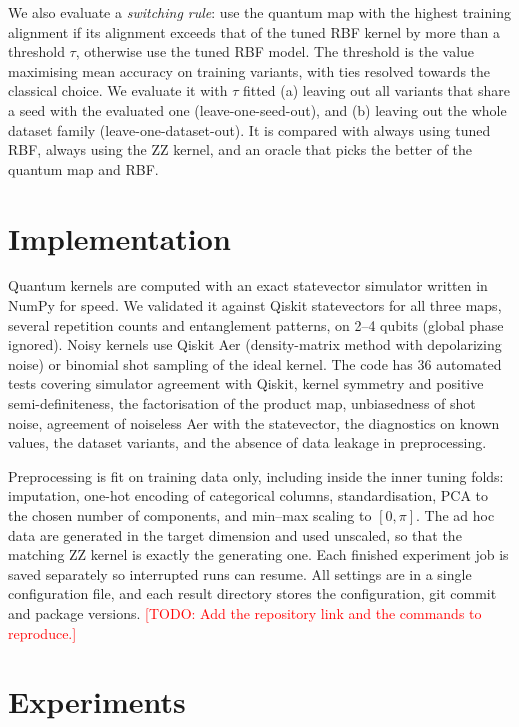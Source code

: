 \documentclass[11pt,a4paper]{article}
\newcommand{\todo}[1]{\textcolor{red}{[TODO: #1]}}
\begin{document}
We also evaluate a \emph{switching rule}: use the quantum map with the highest training alignment if its alignment exceeds that of the tuned RBF kernel by more than a threshold $\tau$, otherwise use the tuned RBF model. The threshold is the value maximising mean accuracy on training variants, with ties resolved towards the classical choice. We evaluate it with $\tau$ fitted (a) leaving out all variants that share a seed with the evaluated one (leave-one-seed-out), and (b) leaving out the whole dataset family (leave-one-dataset-out). It is compared with always using tuned RBF, always using the ZZ kernel, and an oracle that picks the better of the quantum map and RBF.

\section{Implementation}\label{sec:impl}
Quantum kernels are computed with an exact statevector simulator written in NumPy for speed. We validated it against Qiskit statevectors for all three maps, several repetition counts and entanglement patterns, on 2--4 qubits (global phase ignored). Noisy kernels use Qiskit Aer (density-matrix method with depolarizing noise) or binomial shot sampling of the ideal kernel. The code has 36 automated tests covering simulator agreement with Qiskit, kernel symmetry and positive semi-definiteness, the factorisation of the product map, unbiasedness of shot noise, agreement of noiseless Aer with the statevector, the diagnostics on known values, the dataset variants, and the absence of data leakage in preprocessing.

Preprocessing is fit on training data only, including inside the inner tuning folds: imputation, one-hot encoding of categorical columns, standardisation, PCA to the chosen number of components, and min--max scaling to $[0,\pi]$. The ad hoc data are generated in the target dimension and used unscaled, so that the matching ZZ kernel is exactly the generating one. Each finished experiment job is saved separately so interrupted runs can resume. All settings are in a single configuration file, and each result directory stores the configuration, git commit and package versions. \todo{Add the repository link and the commands to reproduce.}

\section{Experiments}
\end{document}
